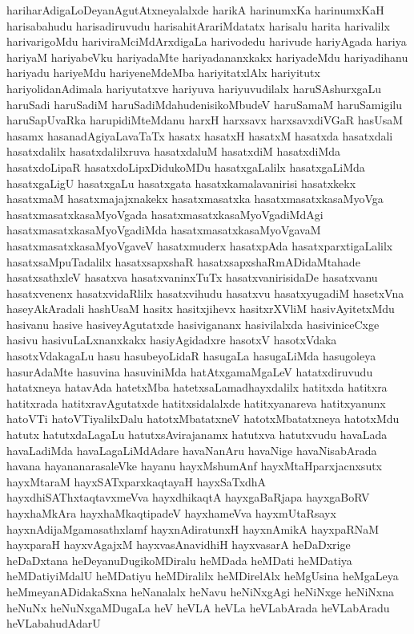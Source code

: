 {hariharAdigaLoDeyanAgutAtxneyalalxde
harikA
harinumxKa
harinumxKaH
harisabahudu
harisadiruvudu
harisahitArariMdatatx
harisalu
harita
harivalilx
harivarigoMdu
hariviraMciMdArxdigaLa
harivodedu
harivude
hariyAgada
hariya
hariyaM
hariyabeVku
hariyadaMte
hariyadananxkakx
hariyadeMdu
hariyadihanu
hariyadu
hariyeMdu
hariyeneMdeMba
hariyitatxlAlx
hariyitutx
hariyolidanAdimala
hariyutatxve
hariyuva
hariyuvudilalx
haruSAshurxgaLu
haruSadi
haruSadiM
haruSadiMdahudenisikoMbudeV
haruSamaM
haruSamigilu
haruSapUvaRka
harupidiMteMdanu
harxH
harxsavx
harxsavxdiVGaR
hasUsaM
hasamx
hasanadAgiyaLavaTaTx
hasatx
hasatxH
hasatxM
hasatxda
hasatxdali
hasatxdalilx
hasatxdalilxruva
hasatxdaluM
hasatxdiM
hasatxdiMda
hasatxdoLipaR
hasatxdoLipxDidukoMDu
hasatxgaLalilx
hasatxgaLiMda
hasatxgaLigU
hasatxgaLu
hasatxgata
hasatxkamalavanirisi
hasatxkekx
hasatxmaM
hasatxmajajxnakekx
hasatxmasatxka
hasatxmasatxkasaMyoVga
hasatxmasatxkasaMyoVgada
hasatxmasatxkasaMyoVgadiMdAgi
hasatxmasatxkasaMyoVgadiMda
hasatxmasatxkasaMyoVgavaM
hasatxmasatxkasaMyoVgaveV
hasatxmuderx
hasatxpAda
hasatxparxtigaLalilx
hasatxsaMpuTadalilx
hasatxsapxshaR
hasatxsapxshaRmADidaMtahade
hasatxsathxleV
hasatxva
hasatxvaninxTuTx
hasatxvanirisidaDe
hasatxvanu
hasatxvenenx
hasatxvidaRlilx
hasatxvihudu
hasatxvu
hasatxyugadiM
hasetxVna
haseyAkAradali
hashUsaM
hasitx
hasitxjihevx
hasitxrXVliM
hasivAyitetxMdu
hasivanu
hasive
hasiveyAgutatxde
hasivigananx
hasivilalxda
hasiviniceCxge
hasivu
hasivuLaLxnanxkakx
hasiyAgidadxre
hasotxV
hasotxVdaka
hasotxVdakagaLu
hasu
hasubeyoLidaR
hasugaLa
hasugaLiMda
hasugoleya
hasurAdaMte
hasuvina
hasuviniMda
hatAtxgamaMgaLeV
hatatxdiruvudu
hatatxneya
hatavAda
hatetxMba
hatetxsaLamadhayxdalilx
hatitxda
hatitxra
hatitxrada
hatitxravAgutatxde
hatitxsidalalxde
hatitxyanareva
hatitxyanunx
hatoVTi
hatoVTiyalilxDalu
hatotxMbatatxneV
hatotxMbatatxneya
hatotxMdu
hatutx
hatutxdaLagaLu
hatutxsAvirajanamx
hatutxva
hatutxvudu
havaLada
havaLadiMda
havaLagaLiMdAdare
havaNanAru
havaNige
havaNisabArada
havana
hayananarasaleVke
hayanu
hayxMshumAnf
hayxMtaHparxjacnxsutx
hayxMtaraM
hayxSATxparxkaqtayaH
hayxSaTxdhA
hayxdhiSAThxtaqtavxmeVva
hayxdhikaqtA
hayxgaBaRjapa
hayxgaBoRV
hayxhaMkAra
hayxhaMkaqtipadeV
hayxhameVva
hayxmUtaRsayx
hayxnAdijaMgamasathxlamf
hayxnAdiratunxH
hayxnAmikA
hayxpaRNaM
hayxparaH
hayxvAgajxM
hayxvasAnavidhiH
hayxvasarA
heDaDxrige
heDaDxtana
heDeyanuDugikoMDiralu
heMDada
heMDati
heMDatiya
heMDatiyiMdalU
heMDatiyu
heMDiralilx
heMDirelAlx
heMgUsina
heMgaLeya
heMmeyanADidakaSxna
heNanalalx
heNavu
heNiNxgAgi
heNiNxge
heNiNxna
heNuNx
heNuNxgaMDugaLa
heV
heVLA
heVLa
heVLabArada
heVLabAradu
heVLabahudAdarU
}
